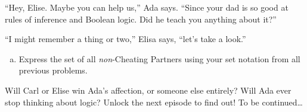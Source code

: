 \documentclass{article}
\begin{document}
``Hey, Elise. Maybe you can help us,'' Ada says.
``Since your dad is so good at rules of inference and Boolean logic.
Did he teach you anything about it?''

``I might remember a thing or two,'' Elisa says, ``let's take a look.''

\begin{enumerate}[(d)]
\item
Express the set of all \emph{non}-Cheating Partners
using your set notation from all previous problems.
\end{enumerate}

Will Carl or Elise win Ada's affection, or someone else
entirely?
Will Ada ever stop thinking about logic?
Unlock the next episode to find out!
To be continued\ldots
\end{document}
